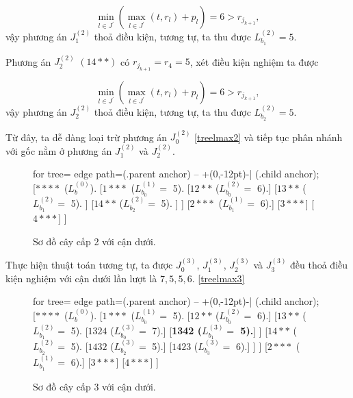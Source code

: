 \begin{vd}
\begin{equation*}
\underset{l \in J^{'}}{\min} (\underset{l \in J^{'}}{\max} (t, r_l) + p_l) = 6 > r_{j_{k+1}},
\end{equation*}
vậy phương án $J_1^{(2)}$ thoả điều kiện, tương tự, ta thu được $L_{b_1}^{(2)} = 5$.

Phương án $J_2^{(2)}$ $(14**)$ có $r_{j_{k+1}} = r_4 = 5$, xét điều kiện nghiệm ta được

\begin{equation*}
\underset{l \in J^{'}}{\min} (\underset{l \in J^{'}}{\max} (t, r_l) + p_l) = 6 > r_{j_{k+1}},
\end{equation*}
vậy phương án $J_2^{(2)}$ thoả điều kiện, tương tự, ta thu được $L_{b_2}^{(2)} = 5$.

Từ đây, ta dễ dàng loại trừ phương án $J_0^{(2)}$ \eqref{treelmax2} và tiếp tục phân nhánh với gốc nằm ở phương án $J_1^{(2)}$ và $J_2^{(2)}$.


\begin{figure}[h!]
	\centering
	\begin{forest} for tree={
		edge path={\noexpand{} (.parent anchor) -- +(0,-12pt)-| (.child anchor);}
	}
	[{$****$ ($L_b^{(0)}$).}
		[{$1***$ ($L_{b_0}^{(1)} =$ 5).}
			[{$12**$ ($L_{b_0}^{(2)} =$ 6).}]
			[{$13**$ ($L_{b_1}^{(2)} =$ 5).}
			]
			[{$14**$ ($L_{b_2}^{(2)} =$ 5).}
			]
		]
		[{$2***$ ($L_{b_1}^{(1)} =$ 6).}]
		[$3***$]
		[$4***$]
	]
	\end{forest}
\caption{\label{treelmax2} Sơ đồ cây cấp 2 với cận dưới.}
\end{figure}

Thực hiện thuật toán tương tự, ta được $J_0^{(3)}$, $J_1^{(3)}$, $J_2^{(3)}$ và $J_3^{(3)}$ đều thoả điều kiện nghiệm với cận dưới lần lượt là $7,5,5,6$. \eqref{treelmax3}

\begin{figure}[h!]
	\centering
	\begin{forest} for tree={
		edge path={\noexpand{} (.parent anchor) -- +(0,-12pt)-| (.child anchor);}
	}
	[{$****$ ($L_b^{(0)}$).}
		[{$1***$ ($L_{b_0}^{(1)} =$ 5).}
			[{$12**$ ($L_{b_0}^{(2)} =$ 6).}]
			[{$13**$ ($L_{b_1}^{(2)} =$ 5).}
				[{$1324$ ($L_{b_0}^{(3)} =$ 7).}]
				[{\textbf{1342 ($L_{b_1}^{(3)} =$ 5).}}]
			]
			[{$14**$ ($L_{b_2}^{(2)} =$ 5).}
				[{$1432$ ($L_{b_2}^{(3)} =$ 5).}]
				[{$1423$ ($L_{b_3}^{(3)} =$ 6).}]
			]
		]
		[{$2***$ ($L_{b_1}^{(1)} =$ 6).}]
		[$3***$]
		[$4***$]
	]
	\end{forest}
\caption{\label{treelmax3} Sơ đồ cây cấp 3 với cận dưới.}
\end{figure}



\end{vd}
